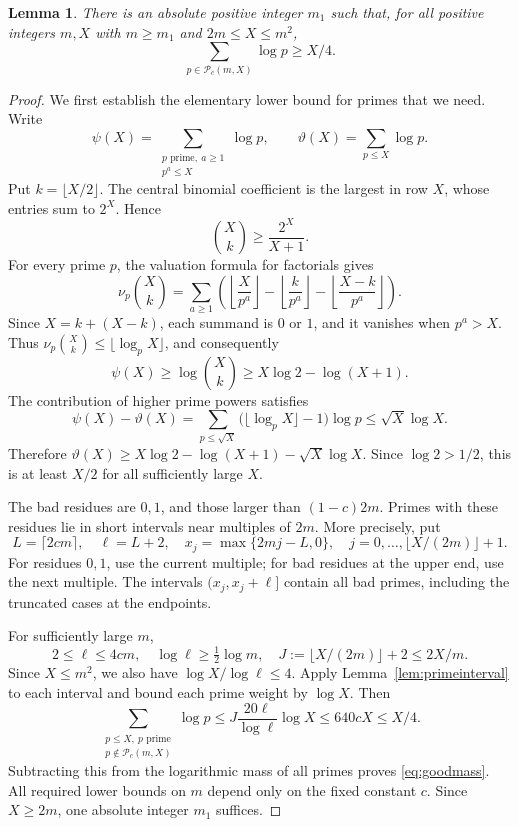 \documentclass[12pt,leqno]{article}
\numberwithin{equation}{section}
\newtheorem{lemma}[theorem]{Lemma}
\theoremstyle{remark}
\begin{document}
\begin{lemma}\label{lem:goodmass}
There is an absolute positive integer $m_1$ such that, for all positive integers $m,X$ with $m\ge m_1$ and $2m\le X\le m^2$,
\begin{equation}\label{eq:goodmass}
\sum_{p\in\mathcal P_c(m,X)}\log p\ge X/4.
\end{equation}
\end{lemma}
\begin{proof}
We first establish the elementary lower bound for primes that we need. Write
\[
\psi(X)=\sum_{\substack{p\text{ prime},\ a\ge1\\p^a\le X}}\log p,
\qquad \vartheta(X)=\sum_{p\le X}\log p.
\]
Put $k=\lfloor X/2\rfloor$. The central binomial coefficient is the largest in row $X$, whose entries sum to $2^X$. Hence
\[
\binom Xk\ge\frac{2^X}{X+1}.
\]
For every prime $p$, the valuation formula for factorials gives
\[
\nu_p\binom Xk
=\sum_{a\ge1}\left(
\left\lfloor\frac X{p^a}\right\rfloor
-\left\lfloor\frac k{p^a}\right\rfloor
-\left\lfloor\frac{X-k}{p^a}\right\rfloor\right).
\]
Since $X=k+(X-k)$, each summand is $0$ or $1$, and it vanishes when $p^a>X$. Thus
$\nu_p\binom Xk\le\lfloor\log_pX\rfloor$, and consequently
\[
\psi(X)\ge\log\binom Xk\ge X\log2-\log(X+1).
\]
The contribution of higher prime powers satisfies
\[
\psi(X)-\vartheta(X)
=\sum_{p\le\sqrt X}\bigl(\lfloor\log_pX\rfloor-1\bigr)\log p
\le\sqrt X\log X.
\]
Therefore $\vartheta(X)\ge X\log2-\log(X+1)-\sqrt X\log X$. Since $\log2>1/2$, this is at least $X/2$ for all sufficiently large $X$.

The bad residues are $0,1$, and those larger than $(1-c)2m$. Primes with these residues lie in short intervals near multiples of $2m$. More precisely, put
\[
L=\lceil2cm\rceil,\quad \ell=L+2,\quad
x_j=\max\{2mj-L,0\},\quad j=0,\ldots,\lfloor X/(2m)\rfloor+1.
\]
For residues $0,1$, use the current multiple; for bad residues at the upper end, use the next multiple. The intervals $(x_j,x_j+\ell]$ contain all bad primes, including the truncated cases at the endpoints.

For sufficiently large $m$,
\[
2\le\ell\le4cm,\quad \log\ell\ge\tfrac12\log m,
\quad J:=\lfloor X/(2m)\rfloor+2\le2X/m.
\]
Since $X\le m^2$, we also have $\log X/\log\ell\le4$. Apply Lemma~\ref{lem:primeinterval} to each interval and bound each prime weight by $\log X$. Then
\[
\sum_{\substack{p\le X,\ p\text{ prime}\\p\notin\mathcal P_c(m,X)}}\log p
\le J\frac{20\ell}{\log\ell}\log X\le640cX\le X/4.
\]
Subtracting this from the logarithmic mass of all primes proves \eqref{eq:goodmass}. All required lower bounds on $m$ depend only on the fixed constant $c$. Since $X\ge2m$, one absolute integer $m_1$ suffices.
\end{proof}
\end{document}
